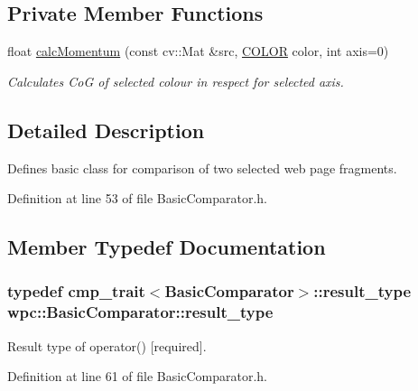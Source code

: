 \subsection*{Private Member Functions}
\begin{DoxyCompactItemize}
\item 
float \hyperlink{classwpc_1_1_basic_comparator_a2d12f50c780cf75e00c2e4aa0465a1f5}{calc\-Momentum} (const cv\-::\-Mat \&src, \hyperlink{classwpc_1_1_basic_comparator_a95f6a6f66cb3a479371c101a35eebb6b}{C\-O\-L\-O\-R} color, int axis=0)
\begin{DoxyCompactList}\small\item\em Calculates Co\-G of selected colour in respect for selected axis. \end{DoxyCompactList}\end{DoxyCompactItemize}


\subsection{Detailed Description}
Defines basic class for comparison of two selected web page fragments. 

Definition at line 53 of file Basic\-Comparator.\-h.



\subsection{Member Typedef Documentation}
\hypertarget{classwpc_1_1_basic_comparator_af93928e437d832b942be5396c4f453d1}{
\subsubsection[{result\-\_\-type}]{\setlength{\rightskip}{0pt plus 5cm}typedef {\bf cmp\-\_\-trait}$<${\bf Basic\-Comparator}$>$\-::{\bf result\-\_\-type} {\bf wpc\-::\-Basic\-Comparator\-::result\-\_\-type}}}\label{classwpc_1_1_basic_comparator_af93928e437d832b942be5396c4f453d1}


Result type of operator() \mbox{[}required\mbox{]}. 



Definition at line 61 of file Basic\-Comparator.\-h.



